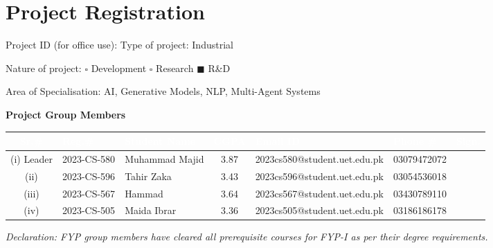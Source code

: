 \documentclass[11pt,a4paper]{article}
\begin{document}
\section*{Project Registration}

\noindent Project ID (for office use): \underline{\hspace{4cm}} \hfill Type of project: Industrial

\vspace{0.3cm}
\noindent Nature of project: $\square$ Development \quad $\square$ Research \quad $\blacksquare$ R\&D

\noindent Area of Specialisation: AI, Generative Models, NLP, Multi-Agent Systems

\vspace{0.4cm}
\noindent\textbf{Project Group Members}

\begin{center}
\begin{tabular}{|c|l|l|c|l|l|c|}
\hline
\rowcolor{headerblue}
\textcolor{white}{\textbf{Sr.\#}} & \textcolor{white}{\textbf{Reg.\#}} & \textcolor{white}{\textbf{Student Name}} & \textcolor{white}{\textbf{CGPA}} & \textcolor{white}{\textbf{Email ID}} & \textcolor{white}{\textbf{Phone \#}} & \textcolor{white}{\textbf{Sign.}} \\
\hline
(i) Leader & 2023-CS-580 & Muhammad Majid & 3.87 & 2023cs580@student.uet.edu.pk & 03079472072 & \\
\hline
(ii) & 2023-CS-596 & Tahir Zaka & 3.43 & 2023cs596@student.uet.edu.pk & 03054536018 & \\
\hline
(iii) & 2023-CS-567 & Hammad & 3.64 & 2023cs567@student.uet.edu.pk & 03430789110 & \\
\hline
(iv) & 2023-CS-505 & Maida Ibrar & 3.36 & 2023cs505@student.uet.edu.pk & 03186186178 & \\
\hline
\end{tabular}
\end{center}

\vspace{0.4cm}
\noindent\textit{Declaration: FYP group members have cleared all prerequisite courses for FYP-I as per their degree requirements.}

\clearpage

\end{document}
